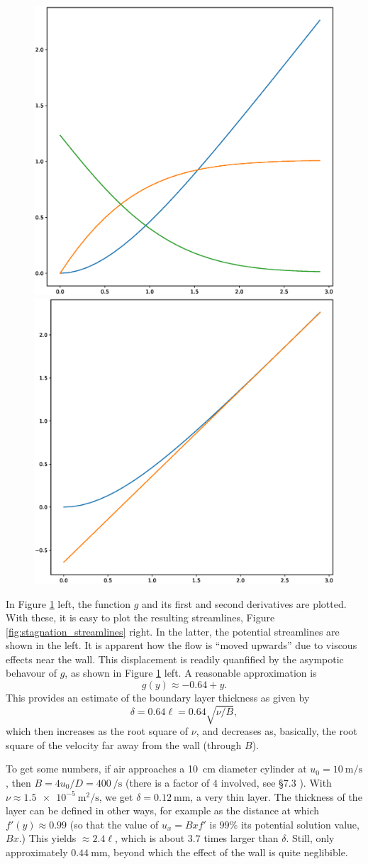 

\begin{figure}
  \centering
  \includegraphics[width=0.4\linewidth]{figures/stagnation_functions}
    \includegraphics[width=0.4\linewidth]{figures/stagnation_function_disp}
  \caption{\label{fig:stagnation_functions}}
\end{figure}


In Figure \ref{fig:stagnation_functions} left, the function $g$ and
its first and second derivatives are plotted. With these, it is easy
to plot the resulting streamlines, Figure
\ref{fig:stagnation_streamlines} right. In the latter, the potential
streamlines are shown in the left. It is apparent how the flow is
``moved upwards'' due to viscous effects near the wall. This
displacement is readily quanfified by the asympotic behavour of $g$,
as shown in Figure \ref{fig:stagnation_functions} left. A reasonable
approximation is
\[
g(y) \approx -0.64 + y .
\]
This provides an estimate of the boundary layer thickness as given
by
\[
\delta = 0.64 \ell =  0.64 \sqrt{\nu/B} ,
\]
which then increases as the root square of $\nu$, and decreases as,
basically, the root square of the velocity far away from the wall
(through $B$).

To get some numbers, if air approaches a \SI{10}{\centi\meter} diameter
cylinder at $u_0=\SI{10}{\meter\per\second}$, then
$B = 4u_0/D =\SI{400}{\per\second}$ (there is a factor of $4$
involved, see \cite{white} \S 7.3 ). With
$\nu\approx\SI{1.5e-5}{\meter\squared\per\second}$, we get
$\delta = \SI{0.12}{\milli\meter}$, a very thin layer. The thickness of
the layer can be defined in other ways, for example as the distance at
which $f'(y) \approx 0.99 $ (so that the value of $u_x = B x f'$ is
$99\%$ its potential solution value, $B x$.) This yields
$\approx 2.4 \ell$, which is about $3.7$ times larger than
$\delta$. Still, only approximately $ \SI{0.44}{\milli\meter}$, beyond
which the effect of the wall is quite neglibible.

